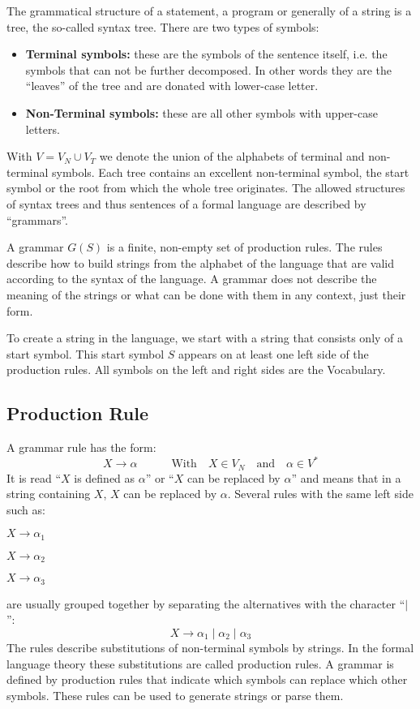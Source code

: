 The grammatical structure of a statement, a program or generally of a string is a tree, the so-called syntax tree. There are two types of symbols:
\begin{itemize}
\item \textbf{Terminal symbols: }these are the symbols of the sentence itself, i.e. the symbols that can not be further decomposed. In other words they are the ``leaves'' of the tree and are donated with lower-case letter. 
\item \textbf{Non-Terminal symbols: }these are all other symbols with upper-case letters.
\end{itemize}
With $V=V_N \cup V_T$ we denote the union of the alphabets of terminal and non-terminal symbols.
Each tree contains an excellent non-terminal symbol, the start symbol or the root from which the whole tree originates. The allowed structures of syntax trees and thus sentences of a formal language are described by ``grammars''.

A grammar $G(S)$ is a finite, non-empty set of production rules. The rules describe how to build strings from the alphabet of the language that are valid according to the syntax of the language. A grammar does not describe the meaning of the strings or what can be done with them in any context, just their form.

To create a string in the language, we start with a string that consists only of a start symbol. This start symbol $S$ appears on at least one left side of the production rules. All symbols on the left and right sides are the Vocabulary.
\subsection{Production Rule}
A grammar rule has the form:
$$X \rightarrow \alpha \qquad \quad \textrm{With} \quad X \in V_N \quad \textrm{and} \quad \alpha \in V^*$$
It is read ``$X$ is defined as $\alpha$'' or ``$X$ can be replaced by $\alpha$'' and means that in a string containing $X$, $X$ can be replaced by $\alpha$. Several rules with the same left side such as:

$X \rightarrow \alpha_1$

$X \rightarrow \alpha_2$

$X \rightarrow \alpha_3$

are usually grouped together by separating the alternatives with the character ``$\mid$'':
$$X \rightarrow \alpha_1 \mid \alpha_2 \mid \alpha_3$$
The rules describe substitutions of non-terminal symbols by strings. In the formal language theory these substitutions are called production rules. A grammar is defined by production rules that indicate which symbols can replace which other symbols. These rules can be used to generate strings or parse them.

